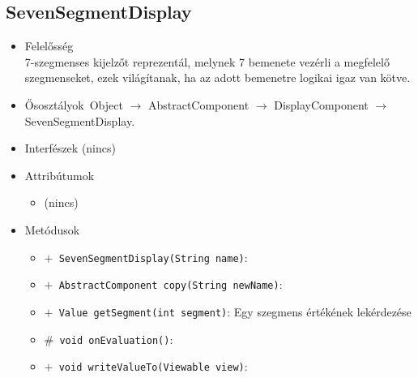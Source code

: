 \subsection{SevenSegmentDisplay}
\begin{itemize}
\item Felelősség\\
7-szegmenses kijelzőt reprezentál, melynek 7 bemenete vezérli a  megfelelő szegmenseket, ezek világítanak, ha az adott bemenetre logikai  igaz van kötve.
\item Ősosztályok\ Object $\rightarrow{}$ AbstractComponent $\rightarrow{}$ DisplayComponent $\rightarrow{}$ SevenSegmentDisplay.
\item Interfészek (nincs)
\item Attribútumok $\ $
\begin{itemize}
\item (nincs)
\end{itemize}
\item Metódusok$\ $
\begin{itemize}
	\item[] \texttt{$+$ SevenSegmentDisplay(String name)}: 
	\item[] \texttt{$+$ AbstractComponent copy(String newName)}: 
	\item[] \texttt{$+$ Value getSegment(int segment)}: Egy szegmens értékének lekérdezése
	\item[] \texttt{$\#$ void onEvaluation()}: 
	\item[] \texttt{$+$ void writeValueTo(Viewable view)}: 
\end{itemize}
\end{itemize}


